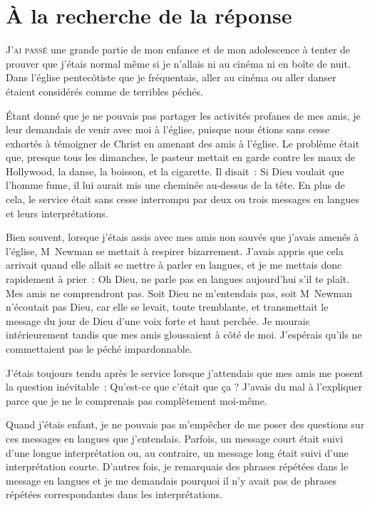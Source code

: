 \chapter{\`A la recherche de la r\'eponse}

\lettrine{J}{'ai passé}
 une grande partie de mon enfance et de mon
 adolescence à tenter de prouver que j'étais normal même si je n'allais ni au
 cinéma ni en boîte de nuit. Dans l'église pentecôtiste que je fréquentais,
 aller au cinéma ou aller danser étaient considérés comme de terribles péchés.

Étant donné que je ne pouvais pas partager les activités profanes
 de mes amis, je leur demandais de venir avec moi à l'église,
 puisque nous étions sans cesse exhortés à témoigner de Christ en amenant
 des amis à l'église. Le problème était que, presque tous les dimanches,
 le pasteur mettait en garde contre les
 maux de Hollywood, la danse, la boisson, et la cigarette.
 Il disait~: \Og Si Dieu voulait que l'homme fume, il lui aurait mis une
 cheminée au-dessus de la tête.\Fg{}
 En plus de cela, le service était sans cesse interrompu par deux ou trois
 \Og messages en langues \Fg{} et leurs interprétations.

Bien souvent, lorsque j'étais assis avec mes amis non sauvés que j'avais
 amenés à l'église, M~Newman se mettait à respirer bizarrement.
 J'avais appris que cela arrivait quand elle allait se mettre à parler en
 langues, et je me mettais donc rapidement à prier~:
 \Og Oh Dieu, ne parle pas en langues aujourd'hui s'il te plaît.
 Mes amis ne comprendront pas. \Fg{}
 Soit Dieu ne m'entendais pas, soit M~Newman n'écoutait pas Dieu,
 car elle se levait, toute tremblante, et transmettait le message du jour de Dieu
 d'une voix forte et haut perchée. Je mourais intérieurement tandis que mes amis
 gloussaient à côté de moi. J'espérais qu'ils ne commettaient pas le péché
 impardonnable.

J'étais toujours tendu après le service lorsque j'attendais que mes amis me
 posent la question inévitable~:
 \Og Qu'est-ce que c'était que ça ? \Fg{}
 J'avais du mal à l'expliquer parce que je ne le comprenais pas complètement
 moi-même.
\noclub[3]

Quand j'étais enfant, je ne pouvais pas m'empêcher de me poser des questions sur
 ces \Og messages en langues \Fg{} que j'entendais. Parfois, un message court
 était suivi d'une longue interprétation ou, au contraire, un message long était
 suivi d'une interprétation courte. D'autres fois, je remarquais des phrases
 répétées dans le message en langues et je me demandais pourquoi il n'y avait
 pas de phrases répétées correspondantes dans les interprétations.

